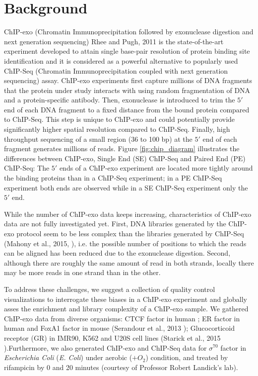 \documentclass{bmcart}\usepackage[]{graphicx}\usepackage[]{color}
\newcommand{\sig}{\sigma^{70}}
\begin{document}
\newpage

\section{Background}
\label{sec:intro}

ChIP-exo (Chromatin Immunoprecipitation followed by exonuclease
digestion and next generation sequencing) Rhee and Pugh, 2011
\cite{exo1} is the state-of-the-art experiment developed to attain
single base-pair resolution of protein binding site identification and
it is considered as a powerful alternative to popularly used ChIP-Seq
(Chromatin Immunoprecipitation coupled with next generation
sequencing) assay. ChIP-exo experiments first capture millions of DNA
fragments that the protein under study interacts with using random
fragmentation of DNA and a protein-specific antibody. Then,
exonuclease is introduced to trim the $5\prime$ end of each DNA
fragment to a fixed distance from the bound protein compared to
ChIP-Seq. This step is unique to ChIP-exo and could potentially
provide significantly higher spatial resolution compared to
ChIP-Seq. Finally, high throughput sequencing of a small region (36 to
100 bp) at the $5\prime$ end of each fragment generates millions of
reads. Figure \ref{fig:chip_diagram} illustrates the differences
between ChIP-exo, Single End (SE) ChIP-Seq and Paired End (PE)
ChIP-Seq: The $5\prime$ ends of a ChIP-exo experiment are located more
tightly around the binding proteins than in a ChIP-Seq experiment; in
a PE ChIP-Seq experiment both ends are observed while in a SE ChIP-Seq
experiment only the $5\prime$ end.


While the number of ChIP-exo data keeps increasing, characteristics of
ChIP-exo data are not fully investigated yet. First, DNA libraries
generated by the ChIP-exo protocol seem to be less complex than the
libraries generated by ChIP-Seq (Mahony et al., 2015,
\cite{exo_review}), i.e. the possible number of positions to which the
reads can be aligned has been reduced due to the exonuclease
digestion. Second, although there are roughly the same amount of read
in both strands, locally there may be more reads in one strand than in
the other. 


To address these challenges, we suggest a collection of
quality control visualizations to interrogate these biases in a
ChIP-exo experiment and globally asses the enrichment and library
complexity of a ChIP-exo sample. We gathered ChIP-exo data from
diverse organisms: CTCF factor in human \cite{exo1}; ER factor in
human and FoxA1 factor in mouse (Serandour et al., 2013
\cite{exoillumina}); Glucocorticoid receptor (GR) in IMR90, K562 and
U20S cell lines (Starick et al., 2015 \cite{starick15}).Furthermore,
we also generated ChIP-exo and ChIP-Seq data for $\sig$ factor in
\emph{Escherichia Coli} (\emph{E. Coli}) under aerobic ($ + O_2$)
condition, and treated by rifampicin by 0 and 20 minutes (courtesy of
Professor Robert Landick's lab).
\end{document}
